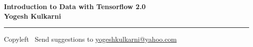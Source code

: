 
\graphicspath{{images/}}

\footnotesize


\begin{center}
\Large{\textbf{Introduction to Data with Tensorflow 2.0\\ Yogesh Kulkarni}}  
\end{center}

\begin{multicols}{2}
% 

\end{multicols}

\rule{\linewidth}{0.25pt}
\scriptsize
Copyleft \textcopyleft\  Send suggestions to 
\href{http://yati.io}{yogeshkulkarni@yahoo.com}


